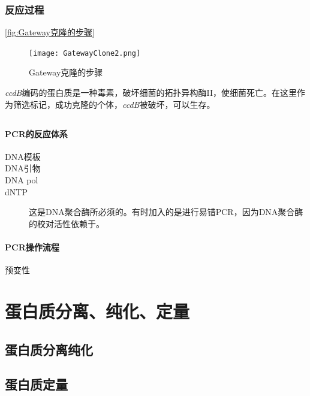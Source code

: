 \subsubsection{反应过程}

\autoref{fig:Gateway克隆的步骤}

\begin{figure}[htbp]
	\centering
	\texttt{[image: GatewayClone2.png]}
	\caption{Gateway克隆的步骤}
	\label{fig:Gateway克隆的步骤}
\end{figure}

\textit{ccdB}编码的蛋白质是一种毒素，破坏细菌的拓扑异构酶II，使细菌死亡。在这里作为筛选标记，成功克隆的个体，\textit{ccdB}被破坏，可以生存。

\subsection[聚合酶链式反应（PCR）]{}

\paragraph{PCR的反应体系}

\begin{description}
	\item[DNA模板]
	\item[DNA引物]
	\item[DNA pol]
	\item[dNTP]
	\item[] 这是DNA聚合酶所必须的。有时加入的是进行易错PCR，因为DNA聚合酶的校对活性依赖于。
\end{description}

\paragraph{PCR操作流程}

预变性




\section{蛋白质分离、纯化、定量}

\subsection{蛋白质分离纯化}

\subsection{蛋白质定量}


